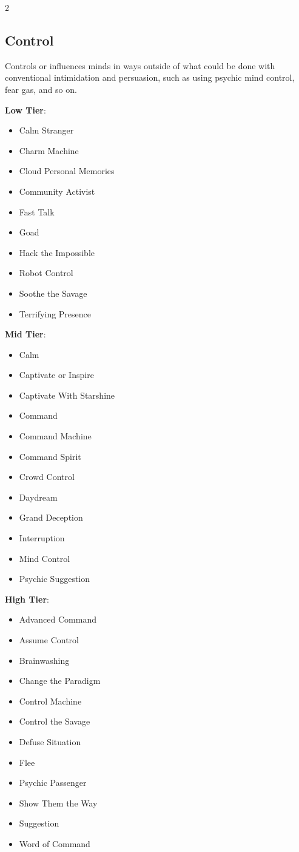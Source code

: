 \begin{multicols}{2}
\subsection{Control}

Controls or influences minds in ways outside of what could be done with conventional intimidation and persuasion, such as using psychic mind control, fear gas, and so on.

\textbf{Low Tier}:

\begin{itemize}
\item Calm Stranger
\item Charm Machine
\item Cloud Personal Memories
\item Community Activist
\item Fast Talk
\item Goad
\item Hack the Impossible
\item Robot Control
\item Soothe the Savage
\item Terrifying Presence
\end{itemize}

\textbf{Mid Tier}:

\begin{itemize}
\item Calm
\item Captivate or Inspire
\item Captivate With Starshine
\item Command
\item Command Machine
\item Command Spirit
\item Crowd Control
\item Daydream
\item Grand Deception
\item Interruption
\item Mind Control
\item Psychic Suggestion
\end{itemize}

\textbf{High Tier}:

\begin{itemize}
\item Advanced Command
\item Assume Control
\item Brainwashing
\item Change the Paradigm
\item Control Machine
\item Control the Savage
\item Defuse Situation
\item Flee
\item Psychic Passenger
\item Show Them the Way
\item Suggestion
\item Word of Command
\end{itemize}


\end{multicols}

